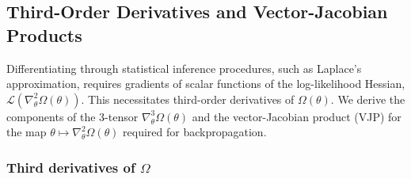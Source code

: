 \documentclass{article}
\begin{document}
\subsection{Third-Order Derivatives and Vector-Jacobian Products}

Differentiating through statistical inference procedures, such as Laplace's approximation, requires gradients of scalar functions of the log-likelihood Hessian, $\mathcal{L}(\nabla_\theta^2 \Omega(\theta))$.
This necessitates third-order derivatives of $\Omega(\theta)$.
We derive the components of the 3-tensor $\nabla_\theta^3 \Omega(\theta)$ and the vector-Jacobian product (VJP) for the map $\theta \mapsto \nabla_\theta^2 \Omega(\theta)$ required for backpropagation.

\subsubsection{Third derivatives of $\Omega$}
\end{document}
